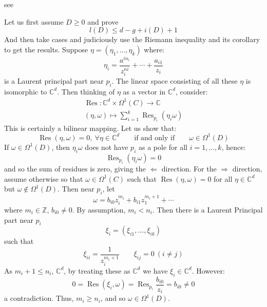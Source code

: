 \documentclass{book}
\newcommand{\C}{{\mathbb{C}}}
\newcommand{\Z}{{\mathbb{Z}}}
\newcommand{\Res}{{\operatorname{Res}}}
\newcommand{\Rw}{\Rightarrow}
\newcommand{\Lw}{\Leftarrow}
\newcommand{\qn}{\quad\newline}
\begin{document}
\begin{Proof}
  see~\cite[p.118]{a.griffithsIntroductionAlgebraicCurves}

  \qn
  Let us first assume $D\ge 0$ and prove
  \[
    l(D) \le d-g+i(D) + 1
  \]
  And then take cases and judiciously use the Riemann inequality and its corollary to get the results. Suppose
  $\eta = (\eta_1, ..., \eta_k)$ where:
  \[
    \eta_i = \frac{a^{in_i}}{z_i^{ni}} + \cdots + \frac{a_{i1}}{z_i}
  \]
  is a Laurent principal part near $p_i$. The linear space consisting of all these $\eta$ is isomorphic to
  $\C^d$. Then thinking of $\eta$ as a vector in $\C^d$, consider:
  \begin{gather*}
    \Res: \C^d \times \Omega^1(C) \to \C\\
    (\eta, \omega) \mapsto \sum_{i=1}^k \Res_{p_i}(\eta_i\omega)
  \end{gather*}
  This is certainly a bilinear mapping. Let us show that:
  \[
    \Res(\eta, \omega) = 0,\ \forall \eta \in \C^d \qquad \text{if and only if} \qquad \omega \in \Omega^1(D)
  \]
  If $\omega \in \Omega^1(D)$, then $\eta_i\omega$ does not have $p_i$ as a pole for all $i = 1,..., k$,
  hence:
  \[
    \Res_{p_i}(\eta_i\omega) = 0
  \]
  and so the sum of residues is zero, giving the $\Lw$ direction. For the $\Rw$ direction, assume otherwise so
  that $\omega \in \Omega^1(C)$ such that $\Res(\eta, \omega) = 0$ for all $\eta \in \C^d$ but $\omega \notin
  \Omega^1(D)$. Then near $p_i$, let
  \[
    \omega = b_{i0}z_i^{m_i} + b_{i1}z_1^{m_i+1} + \cdots
  \]
  where $m_i \in \Z$, $b_{i0} \ne 0$. By assumption, $m_i < n_i$. Then there is a Laurent Principal part near
  $p_i$
  \[
    \xi_i = (\xi_{i1}, ..., \xi_{ik})
  \]
  such that
  \[
    \xi_{ii} = \frac{1}{z_i^{m_i+1}} \qquad \xi_{ij} = 0\ (i\ne j)
  \]
  As $m_i+1 \le n_i$, $\C^d$, by treating these as $\C^d$ we have $\xi_i \in \C^d$. However:
  \[
    0 = \Res(\xi_i, \omega) = \Res_{p_i} \frac{b_{i0}}{z_i} = b_{i0} \ne 0
  \]
  a contradiction. Thus, $m_i \ge n_i$, and so $\omega \in \Omega^1(D)$.


\end{Proof}
\end{document}

